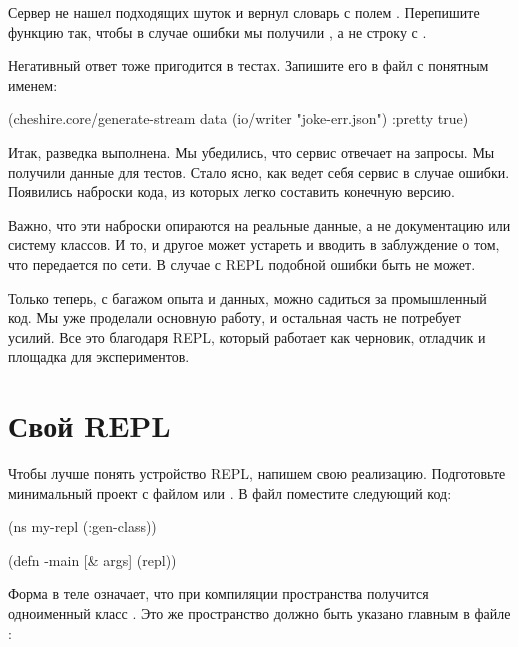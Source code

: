 Сервер не нашел подходящих шуток и вернул словарь с полем . Перепишите функцию так, чтобы в случае ошибки мы получили , а не строку с .

Негативный ответ тоже пригодится в тестах. Запишите его в файл с понятным именем:

\begin{english}
  \begin{clojure}
(cheshire.core/generate-stream
  data
  (io/writer "joke-err.json")
  {:pretty true})
  \end{clojure}
\end{english}

Итак, разведка выполнена. Мы убедились, что сервис отвечает на запросы. Мы получили данные для тестов. Стало ясно, как ведет себя сервис в случае ошибки. Появились наброски кода, из которых легко составить конечную версию.

Важно, что эти наброски опираются на реальные данные, а не документацию или систему классов. И то, и другое может устареть и вводить в заблуждение о том, что передается по сети. В случае с REPL подобной ошибки быть не может.

Только теперь, с багажом опыта и данных, можно садиться за промышленный код. Мы уже проделали основную работу, и остальная часть не потребует усилий. Все это благодаря REPL, который работает как черновик, отладчик и площадка для экспериментов.

\section{Свой REPL}


Чтобы лучше понять устройство REPL, напишем свою реализацию. Подготовьте минимальный проект с файлом  или . В файл  поместите следующий код:

\begin{english}
  \begin{clojure/lines}
(ns my-repl
  (:gen-class))

(defn -main [& args]
  (repl))
  \end{clojure/lines}
\end{english}

Форма  в теле  означает, что при компиляции пространства получится одноименный класс . Это же пространство должно быть указано главным в файле :


